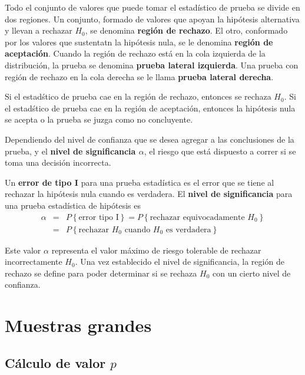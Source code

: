 Todo el conjunto de valores que puede tomar el estad\'istico de prueba se divide en dos regiones. Un conjunto, formado de valores que apoyan la hip\'otesis alternativa y llevan a rechazar $H_{0}$, se denomina \textbf{regi\'on de rechazo}. El otro, conformado por los valores que sustentatn la hip\'otesis nula, se le denomina \textbf{regi\'on de aceptaci\'on}. Cuando la regi\'on de rechazo est\'a en la cola izquierda de la distribuci\'on, la  prueba se denomina \textbf{prueba lateral izquierda}. Una prueba con regi\'on de rechazo en la cola derecha se le llama \textbf{prueba lateral derecha}.\medskip

Si el estad\'stico de prueba cae en la regi\'on de rechazo, entonces se rechaza $H_{0}$. Si el estad\'stico de prueba cae en la regi\'on de aceptaci\'on, entonces la hip\'otesis nula se acepta o la prueba se juzga como no concluyente.\medskip

Dependiendo del nivel de confianza que se desea agregar a las conclusiones de la prueba, y el \textbf{nivel de significancia $\alpha$}, el riesgo que est\'a dispuesto a correr si se toma una decisi\'on incorrecta.

\begin{Def}
Un \textbf{error de tipo I} para una prueba estad\'istica es el error que se tiene al rechazar la hip\'otesis nula cuando es verdadera. El \textbf{nivel de significancia} para una prueba estad\'istica de hip\'otesis es
\begin{eqnarray*}
\alpha&=&P\left\{\textrm{error tipo I}\right\}=P\left\{\textrm{rechazar equivocadamente }H_{0}\right\}\\
&=&P\left\{\textrm{rechazar }H_{0}\textrm{ cuando }H_{0}\textrm{ es verdadera}\right\}
\end{eqnarray*}

\end{Def}
Este valor $\alpha$ representa el valor m\'aximo de riesgo tolerable de rechazar incorrectamente $H_{0}$. Una vez establecido el nivel de significancia, la regi\'on de rechazo se define para poder determinar si se rechaza $H_{0}$ con un cierto nivel de confianza.

\section{Muestras grandes}
\subsection*{ C\'alculo de valor $p$}

